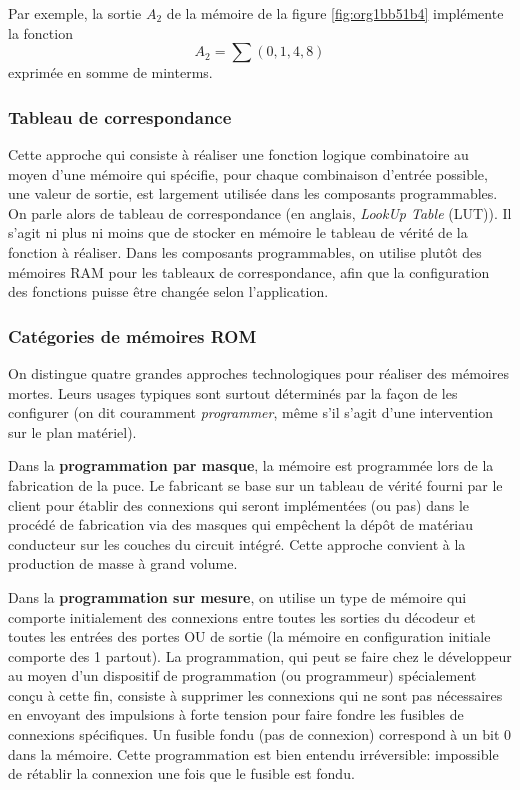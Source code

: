\documentclass[11pt]{article}
\begin{document}
Par exemple, la sortie \(A_2\) de la mémoire de la figure
\ref{fig:org1bb51b4} implémente la fonction $$ A_2 = \sum (0,1,4,8) $$
exprimée en somme de minterms.

\subsubsection{Tableau de correspondance}
\label{sec:orgc338df3}

Cette approche qui consiste à réaliser une fonction logique
combinatoire au moyen d'une mémoire qui spécifie, pour chaque
combinaison d'entrée possible, une valeur de sortie, est largement
utilisée dans les composants programmables. On parle alors de tableau
de correspondance (en anglais, \emph{LookUp Table} (LUT)). Il s'agit ni
plus ni moins que de stocker en mémoire le tableau de vérité de la
fonction à réaliser. Dans les composants programmables, on utilise
plutôt des mémoires RAM pour les tableaux de correspondance, afin que
la configuration des fonctions puisse être changée selon
l'application.

\subsubsection{Catégories de mémoires ROM}
\label{sec:org7b974c4}

On distingue quatre grandes approches technologiques pour réaliser des
mémoires mortes. Leurs usages typiques sont surtout déterminés par la
façon de les configurer (on dit couramment \emph{programmer}, même s'il
s'agit d'une intervention sur le plan matériel).

Dans la \textbf{programmation par masque}, la mémoire est programmée lors de
la fabrication de la puce. Le fabricant se base sur un tableau de
vérité fourni par le client pour établir des connexions qui seront
implémentées (ou pas) dans le procédé de fabrication via des masques
qui empêchent la dépôt de matériau conducteur sur les couches du
circuit intégré.  Cette approche convient à la production de masse à
grand volume.

Dans la \textbf{programmation sur mesure}, on utilise un type de mémoire qui
comporte initialement des connexions entre toutes les sorties du
décodeur et toutes les entrées des portes OU de sortie (la mémoire en
configuration initiale comporte des 1 partout). La programmation, qui
peut se faire chez le développeur au moyen d'un dispositif de
programmation (ou programmeur) spécialement conçu à cette fin,
consiste à supprimer les connexions qui ne sont pas nécessaires en
envoyant des impulsions à forte tension pour faire fondre les fusibles
de connexions spécifiques. Un fusible fondu (pas de connexion)
correspond à un bit 0 dans la mémoire. Cette programmation est bien
entendu irréversible: impossible de rétablir la connexion une fois que
le fusible est fondu.
\end{document}
